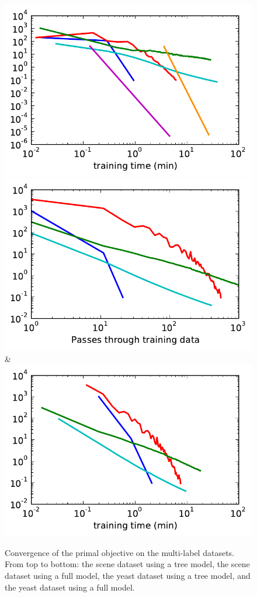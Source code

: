 \begin{figure}
\begin{tabu}
    \includegraphics[width=\linewidth]{evaluation/images/scene_full_log_time}\\
    \includegraphics[width=\linewidth]{evaluation/images/yeast_tree_log}&%
    \includegraphics[width=\linewidth]{evaluation/images/yeast_tree_log_time}
    \end{tabu}
\caption{%
   Convergence of the primal objective on the multi-label datasets. From top to
   bottom: the scene dataset using a tree model, the scene dataset using a full
   model, the yeast dataset using a tree model, and the yeast dataset using a
   full model.
}
\end{figure}

